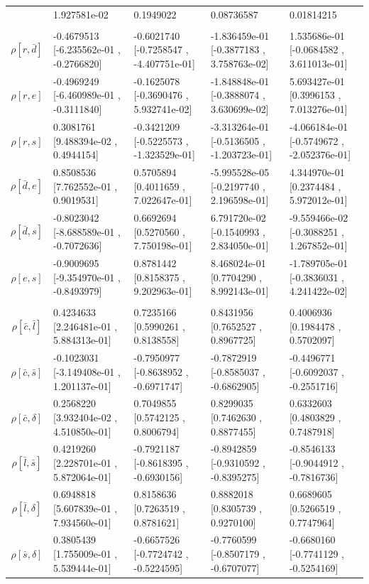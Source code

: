 \begin{center}
\begin{tabular}{|c|p{3.7cm}|p{3.7cm}|p{3.7cm}|p{3.7cm}|}
&1.927581e-02&0.1949022&0.08736587&0.01814215\\
&&&&\\
$\rho[r,\bar{d}]$&-0.4679513 [-6.235562e-01 , -0.2766820]&-0.6021740 [-0.7258547 , -4.407751e-01]&-1.836459e-01 [-0.3877183 , 3.758763e-02]&1.535686e-01 [-0.0684582 , 3.611013e-01]\\
$\rho[r,e]$&-0.4969249 [-6.460989e-01 , -0.3111840]&-0.1625078 [-0.3690476 , 5.932741e-02]&-1.848848e-01 [-0.3888074 , 3.630699e-02]&5.693427e-01 [0.3996153 , 7.013276e-01]\\
$\rho[r,s]$&0.3081761 [9.488394e-02 , 0.4944154]&-0.3421209 [-0.5225573 , -1.323529e-01]&-3.313264e-01 [-0.5136505 , -1.203723e-01]&-4.066184e-01 [-0.5749672 , -2.052376e-01]\\
$\rho[\bar{d},e]$&0.8508536 [7.762552e-01 , 0.9019531]&0.5705894 [0.4011659 , 7.022647e-01]&-5.995528e-05 [-0.2197740 , 2.196598e-01]&4.344970e-01 [0.2374484 , 5.972012e-01]\\
$\rho[\bar{d},s]$&-0.8023042 [-8.688589e-01 , -0.7072636]&0.6692694 [0.5270560 , 7.750198e-01]&6.791720e-02 [-0.1540993 , 2.834050e-01]&-9.559466e-02 [-0.3088251 , 1.267852e-01]\\
$\rho[e,s]$&-0.9009695 [-9.354970e-01 , -0.8493979]&0.8781442 [0.8158375 , 9.202963e-01]&8.468024e-01 [0.7704290 , 8.992143e-01]&-1.789705e-01 [-0.3836031 , 4.241422e-02]\\
&&&&\\
$\rho[\bar{c},\bar{l}]$&0.4234633 [2.246481e-01 , 5.884313e-01]&0.7235166 [0.5990261 , 0.8138558]&0.8431956 [0.7652527 , 0.8967725]&0.4006936 [0.1984478 , 0.5702097]\\
$\rho[\bar{c},\bar{s}]$&-0.1023031 [-3.149408e-01 , 1.201137e-01]&-0.7950977 [-0.8638952 , -0.6971747]&-0.7872919 [-0.8585037 , -0.6862905]&-0.4496771 [-0.6092037 , -0.2551716]\\
$\rho[\bar{c},\delta]$&0.2568220 [3.932404e-02 , 4.510850e-01]&0.7049855 [0.5742125 , 0.8006794]&0.8299035 [0.7462630 , 0.8877455]&0.6332603 [0.4803829 , 0.7487918]\\
$\rho[\bar{l},\bar{s}]$&0.4219260 [2.228701e-01 , 5.872064e-01]&-0.7921187 [-0.8618395 , -0.6930156]&-0.8942859 [-0.9310592 , -0.8395275]&-0.8546133 [-0.9044912 , -0.7816736]\\
$\rho[\bar{l},\delta]$&0.6948818 [5.607839e-01 , 7.934560e-01]&0.8158636 [0.7263519 , 0.8781621]&0.8882018 [0.8305739 , 0.9270100]&0.6689605 [0.5266519 , 0.7747964]\\
$\rho[\bar{s},\delta]$&0.3805439 [1.755009e-01 , 5.539444e-01]&-0.6657526 [-0.7724742 , -0.5224595]&-0.7760599 [-0.8507179 , -0.6707077]&-0.6680160 [-0.7741129 , -0.5254169]\\

\end{tabular}
\end{center}
